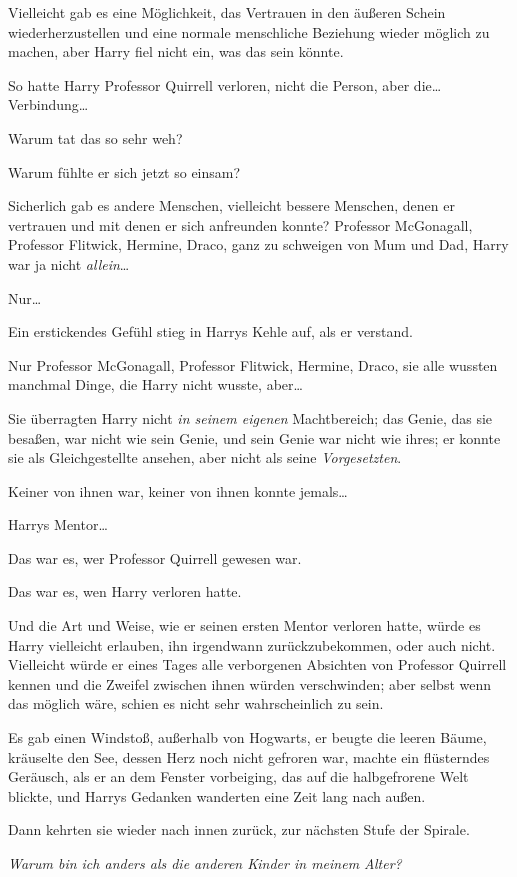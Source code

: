 {Vielleicht gab es eine Möglichkeit, das Vertrauen in den äußeren Schein wiederherzustellen und eine normale menschliche Beziehung wieder möglich zu machen, aber Harry fiel nicht ein, was das sein könnte.

So hatte Harry Professor Quirrell verloren, nicht die Person, aber die… Verbindung…

Warum tat das so sehr weh?

Warum fühlte er sich jetzt so einsam?

Sicherlich gab es andere Menschen, vielleicht bessere Menschen, denen er vertrauen und mit denen er sich anfreunden konnte? Professor McGonagall, Professor Flitwick, Hermine, Draco, ganz zu schweigen von Mum und Dad, Harry war ja nicht \emph{allein}…

Nur…

Ein erstickendes Gefühl stieg in Harrys Kehle auf, als er verstand.

Nur Professor McGonagall, Professor Flitwick, Hermine, Draco, sie alle wussten manchmal Dinge, die Harry nicht wusste, aber…

Sie überragten Harry nicht \emph{in seinem eigenen} Machtbereich; das Genie, das sie besaßen, war nicht wie sein Genie, und sein Genie war nicht wie ihres; er konnte sie als Gleichgestellte ansehen, aber nicht als seine \emph{Vorgesetzten}.

Keiner von ihnen war, keiner von ihnen konnte jemals…

Harrys Mentor…

Das war es, wer Professor Quirrell gewesen war.

Das war es, wen Harry verloren hatte.

Und die Art und Weise, wie er seinen ersten Mentor verloren hatte, würde es Harry vielleicht erlauben, ihn irgendwann zurückzubekommen, oder auch nicht. Vielleicht würde er eines Tages alle verborgenen Absichten von Professor Quirrell kennen und die Zweifel zwischen ihnen würden verschwinden; aber selbst wenn das möglich wäre, schien es nicht sehr wahrscheinlich zu sein.

Es gab einen Windstoß, außerhalb von Hogwarts, er beugte die leeren Bäume, kräuselte den See, dessen Herz noch nicht gefroren war, machte ein flüsterndes Geräusch, als er an dem Fenster vorbeiging, das auf die halbgefrorene Welt blickte, und Harrys Gedanken wanderten eine Zeit lang nach außen.

Dann kehrten sie wieder nach innen zurück, zur nächsten Stufe der Spirale.

\emph{Warum bin ich anders als die anderen Kinder in meinem Alter?}

}
